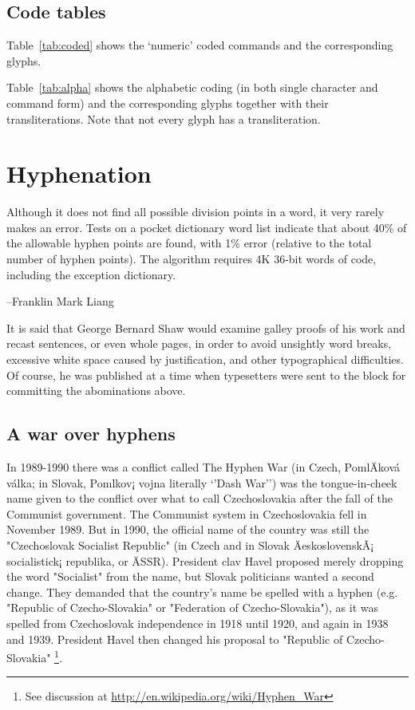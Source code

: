 \section{Code tables}

Table~\ref{tab:coded} 
shows the `numeric' coded commands and the corresponding
glyphs. 

Table~\ref{tab:alpha} 
shows the alphabetic coding (in both single
character and command form) and the corresponding glyphs together with their
transliterations. Note that not every glyph has a transliteration.

\begin{comment}

\begin{center}
  \Large\cartouche{\pmglyph{K:l-i-o-p-a-d:r-a}}
\end{center}
\end{comment}

\chapter{Hyphenation}
\epigraph{Although it does not find all possible division points in a word, it very rarely makes an error. Tests on a pocket dictionary word list indicate that about 40\% of the allowable hyphen points are found, with 1\% error (relative to the total number of hyphen points). The algorithm requires 4K 36-bit words of code, including the exception dictionary.}{--Franklin Mark Liang \citep{liang83}}

\label{ch:hyphenation} 
It is said that George Bernard Shaw would examine galley proofs of his work and recast sentences, or even whole pages, in order to avoid unsightly word breaks, excessive white space caused by justification, and other typographical difficulties. Of course, he was published at a time when typesetters were sent to the block for committing the abominations above.\cite{Major1991} 

\section*{A war over hyphens}
In 1989-1990 there was a conflict called The Hyphen War (in Czech, PomlÄkov\'a v\' alka; in Slovak, Pomlkov¡ vojna literally `'Dash War'') was the tongue-in-cheek name given to the conflict over what to call Czechoslovakia after the fall of the Communist government. The Communist system in Czechoslovakia fell in November 1989. But in 1990, the official name of the country was still the "Czechoslovak Socialist Republic" (in Czech and in Slovak ÄeskoslovenskÃ¡ socialistick¡ republika, or ÄSSR). President clav Havel proposed merely dropping the word "Socialist" from the name, but Slovak politicians wanted a second change. They demanded that the country's name be spelled with a hyphen (e.g. "Republic of Czecho-Slovakia" or "Federation of Czecho-Slovakia"), as it was spelled from Czechoslovak independence in 1918 until 1920, and again in 1938 and 1939. President Havel then changed his proposal to "Republic of Czecho-Slovakia" \footnote{See discussion at \url{http://en.wikipedia.org/wiki/Hyphen_War}}. 

